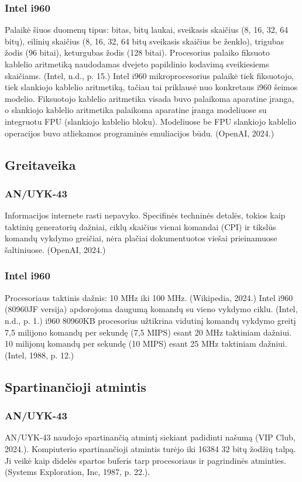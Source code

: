 \documentclass{article}
\begin{document}
\subsubsection{Intel i960}
Palaikė šiuos duomenų tipus: bitas, bitų laukai, sveikasis skaičius (8, 16, 32, 64 bitų), eilinių skaičius (8, 16, 32, 64 bitų sveikasis skaičius be ženklo), trigubas žodis (96 bitai), keturgubas žodis (128 bitai). Procesorius palaiko fiksuoto kablelio aritmetiką naudodamas dvejeto papildinio kodavimą sveikiesiems skaičiams. (Intel, n.d., p. 15.) Intel i960 mikroprocesorius palaikė tiek fiksuotojo, tiek slankiojo kablelio aritmetiką, tačiau tai priklausė nuo konkretaus i960 šeimos modelio. Fiksuotojo kablelio aritmetika visada buvo palaikoma aparatine įranga, o slankiojo kablelio aritmetika palaikoma aparatine įranga modeliuose su integruotu FPU (slankiojo kablelio bloku). Modeliuose be FPU slankiojo kablelio operacijos buvo atliekamos programinės emuliacijos būdu. (OpenAI, 2024.)
\subsection{Greitaveika}
\subsubsection{AN/UYK-43}
Informacijos internete rasti nepavyko. Specifinės techninės detalės, tokios kaip taktinių generatorių dažniai, ciklų skaičius vienai komandai (CPI) ir tikslūs komandų vykdymo greičiai, nėra plačiai dokumentuotos viešai prieinamuose šaltiniuose. (OpenAI, 2024.)
\subsubsection{Intel i960}
Procesoriaus taktinis dažnis: 10 MHz iki 100 MHz. (Wikipedia, 2024.) Intel i960 (80960JF versija) apdorojoma daugumą komandų su vieno vykdymo ciklu. (Intel, n.d., p. 1.) i960 80960KB procesorius užtikrina vidutinį komandų vykdymo greitį 7,5 milijono komandų per sekundę (7,5 MIPS) esant 20 MHz taktiniam dažniui. 10 milijonų komandų per sekundę (10 MIPS) esant 25 MHz taktiniam dažniui. (Intel, 1988, p. 12.)
\subsection{Spartinančioji atmintis}
\subsubsection{AN/UYK-43}
AN/UYK-43 naudojo spartinančią atmintį siekiant padidinti našumą (VIP Club, 2024.). Kompiuterio spartinančioji atmintis turėjo iki 16384 32 bitų žodžių talpą. Ji veikė kaip didelės spartos buferis tarp procesoriaus ir pagrindinės atminties. (Systems Exploration, Inc, 1987, p. 22.).
\end{document}
